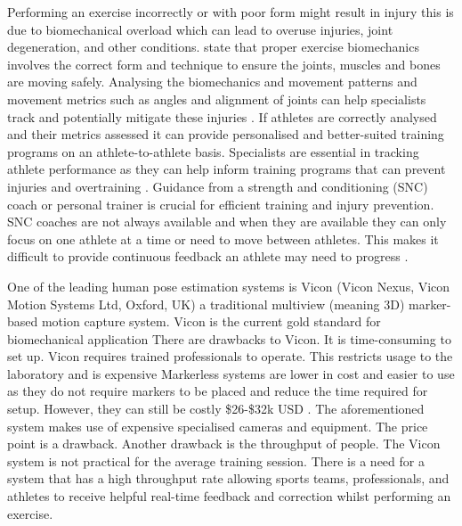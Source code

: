 Performing an exercise incorrectly or with poor form might result in injury \cite{Chariar2023} this is due to biomechanical overload which can lead to overuse injuries, joint degeneration, and other conditions. \citet{Forte2023} state that proper exercise biomechanics involves the correct form and technique to ensure the joints, muscles and bones are moving safely.
Analysing the biomechanics and movement patterns and movement metrics such as angles and alignment of joints can help specialists track and potentially mitigate these injuries \cite{Forte2023}.
If athletes are correctly analysed and their metrics assessed it can provide personalised and better-suited training programs on an athlete-to-athlete basis.
Specialists are essential in tracking athlete performance as they can help inform training programs that can prevent injuries and overtraining \cite{Mileva2022}. %
Guidance from a strength and conditioning (SNC) coach or personal trainer is crucial for efficient training and injury prevention. SNC coaches are not always available and when they are available they can only focus on one athlete at a time or need to move between athletes. This makes it difficult to provide continuous feedback an athlete may need to progress \cite{Needham2021}.

One of the leading human pose estimation systems is Vicon (Vicon Nexus, Vicon Motion Systems Ltd, Oxford, UK) a traditional multiview (meaning 3D) marker-based motion capture system. Vicon is the current gold standard for biomechanical application \cite{Matsuda2025, Hansen2024, Song2022}
There are drawbacks to Vicon. It is time-consuming to set up. Vicon requires trained professionals to operate. This restricts usage to the laboratory and is expensive 
Markerless systems are lower in cost and easier to use as they do not require markers to be placed and reduce the time required for setup. However, they can still be costly \$26-\$32k USD \cite{muir2021}.
The aforementioned system makes use of expensive specialised cameras and equipment. The price point is a drawback. Another drawback is the throughput of people. The Vicon system is not practical for the average training session. There is a need for a system that has a high throughput rate allowing sports teams, professionals, and athletes to receive helpful real-time feedback and correction whilst performing an exercise.

